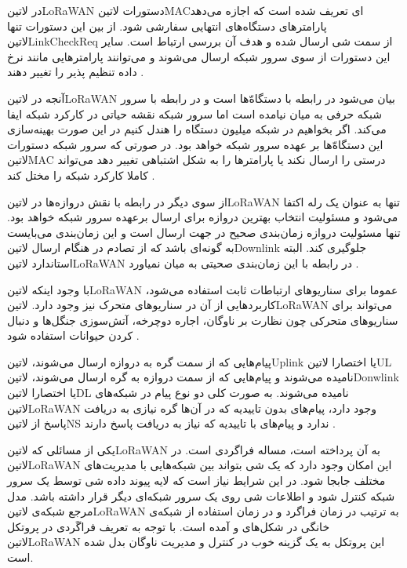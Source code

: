 در ‌لاتین{LoRaWAN} دستورات ‌لاتین{MAC}ای تعریف شده است که اجازه می‌دهد پارامترهای دستگاه‌های انتهایی سفارشی شود.
از بین این دستورات تنها ‌لاتین{LinkCheckReq} از سمت شی ارسال شده و هدف آن بررسی ارتباط است.
سایر این دستورات از سوی سرور شبکه ارسال می‌شوند و می‌توانند پارامترهایی مانند نرخ داده تنظیم پذیر را تغییر دهند
.

آنجه در ‌لاتین{LoRaWAN} بیان می‌شود در رابطه با دستگاه‌ّها است و در رابطه با سرور شبکه حرفی به میان نیامده است اما سرور شبکه نقشه حیاتی در کارکرد شبکه ایفا می‌کند.
اگر بخواهیم در شبکه میلیون دستگاه را هندل کنیم در این صورت بهینه‌سازی این دستگاه‌ّها بر عهده سرور شبکه خواهد بود. در صورتی که سرور شبکه دستورات ‌لاتین{MAC}
درستی را ارسال نکند یا پارامترها را به شکل اشتباهی تغییر دهد می‌تواند کاملا کارکرد شبکه را مختل کند
.

از سوی دیگر در رابطه با نقش دروازه‌ها در ‌لاتین{LoRaWAN} تنها به عنوان یک رله اکتفا می‌شود و مسئولیت انتخاب بهترین دروازه برای ارسال
برعهده سرور شبکه خواهد بود. تنها مسئولیت دروازه زمان‌بندی صحیح در جهت ارسال است و این زمان‌بندی می‌بایست به گونه‌ای باشد که از تصادم در هنگام ارسال
‌لاتین{Downlink} جلوگیری کند. البته استاندارد ‌لاتین{LoRaWAN} در رابطه با این زمان‌بندی صحیتی به میان نمیاورد
.

با وجود اینکه ‌لاتین{LoRaWAN} عموما برای سناریوهای ارتباطات ثابت استفاده می‌شود، کاربردهایی از آن در سناریوهای متحرک نیز وجود دارد.
‌لاتین{LoRaWAN} می‌تواند برای سناریوهای متحرکی چون نظارت بر ناوگان، اجاره دوچرخه، آتش‌سوزی جنگل‌ها و دنبال کردن حیوانات
استفاده شود .

پیام‌هایی که از سمت گره به دروازه ارسال می‌شوند، ‌لاتین{Uplink} یا اختصارا ‌لاتین{UL} نامیده می‌شوند و
پیام‌هایی که از سمت دروازه به گره ارسال می‌شوند، ‌لاتین{Donwlink} یا اختصارا ‌لاتین{DL} نامیده می‌شوند.
به صورت کلی دو نوع پیام در شبکه‌های ‌لاتین{LoRaWAN} وجود دارد، پیام‌های بدون تاییدیه که در آن‌ها گره نیازی به دریافت پاسخ
از ‌لاتین{NS} ندارد و پیام‌های با تاییدیه که نیاز به دریافت پاسخ دارند
.

یکی از مسائلی که ‌لاتین{LoRaWAN} به آن پرداخته است، مساله فراگردی است. در ‌لاتین{LoRaWAN} این امکان وجود دارد
که یک شی بتواند بین شبکه‌هایی با مدیریت‌های مختلف جابجا شود. در این شرایط نیاز است که لایه پیوند داده شی توسط یک
سرور شبکه کنترل شود و اطلاعات شی روی یک سرور شبکه‌ای دیگر قرار داشته باشد. مدل مرجع شبکه‌ی ‌لاتین{LoRaWAN}
به ترتیب در زمان فراگرد و در زمان استفاده از شبکه‌ی خانگی در شکل‌های 
و  آمده است.
با توجه به تعریف فراگَردی در پروتکل ‌لاتین{LoRaWAN} این پروتکل به یک گزینه خوب در کنترل و مدیریت ناوگان بدل شده است.

